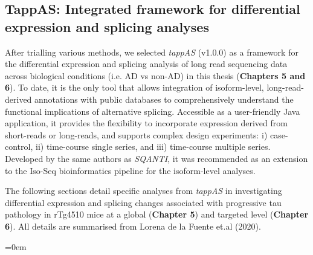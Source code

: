 \subsection{TappAS: Integrated framework for differential expression and splicing analyses}\label{ch3_tappas_explained}
After trialling various methods, we selected \textit{tappAS}\cite{DeLaFuente2020} (v1.0.0) as a framework for the differential expression and splicing analysis of long read sequencing data across biological conditions (i.e. AD vs non-AD) in this thesis (\textbf{Chapters 5 and 6}). To date, it is the only tool that allows integration of isoform-level, long-read-derived annotations with public databases to comprehensively understand the functional implications of alternative splicing. Accessible as a user-friendly Java application, it provides the flexibility to incorporate expression derived from short-reads or long-reads, and supports complex design experiments: i) case-control, ii) time-course single series, and iii) time-course multiple series. Developed by the same authors as \textit{SQANTI}\cite{Tardaguila2018}, it was recommended as an extension to the Iso-Seq bioinformatics pipeline for the isoform-level analyses.    

The following sections detail specific analyses from \textit{tappAS} in investigating differential expression and splicing changes associated with progressive tau pathology in rTg4510 mice at a global (\textbf{Chapter 5}) and targeted level (\textbf{Chapter 6}). All details are summarised from Lorena de la Fuente et.al (2020)\cite{DeLaFuente2020}.

\vspace{2cm}
\begingroup
\parindent=0em
\localtableofcontents 
\endgroup


